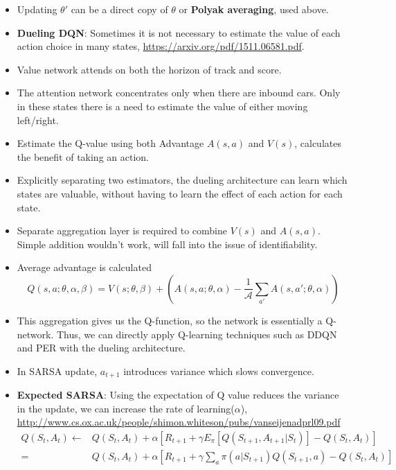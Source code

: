 \documentclass[a4paper]{article}
\begin{document}
\begin{itemize}
    \item Updating $\theta'$ can be a direct copy of $\theta$ or \textbf{Polyak averaging}, used above.
    \item \textbf{Dueling DQN}: Sometimes it is not necessary to estimate the value of each action choice in many states, \url{https://arxiv.org/pdf/1511.06581.pdf}.
    \item Value network attends on both the horizon of track and score.
    \item The attention network concentrates only when there are inbound cars. Only in these states there is a need to estimate the value of either moving left/right.
    \item Estimate the Q-value using both Advantage $A(s,a)$ and $V(s)$, calculates the benefit of taking an action.
    \item Explicitly separating two estimators, the dueling architecture can learn which states are valuable, without having to learn the effect of each action for each state.
    \item Separate aggregation layer is required to combine $V(s)$ and $A(s,a)$. Simple addition wouldn't work, will fall into the issue of identifiability.
    \item Average advantage is calculated
    \begin{equation*}
        Q(s,a;\theta,\alpha,\beta)=V(s;\theta,\beta)+(A(s,a;\theta,\alpha)-\frac{1}{\mathcal{A}}\sum_{a'}A(s,a';\theta,\alpha))
    \end{equation*}
    \item This aggregation gives us the Q-function, so the network is essentially a Q-network. Thus, we can directly apply Q-learning techniques such as DDQN and PER with the dueling architecture.
    \item In SARSA update, $a_{t+1}$ introduces variance which slows convergence.
    \item \textbf{Expected SARSA}: Using the expectation of Q value reduces the variance in the update, we can increase the rate of learning($\alpha$), \url{http://www.cs.ox.ac.uk/people/shimon.whiteson/pubs/vanseijenadprl09.pdf}
    \begin{equation*}
        \begin{split}
            Q(S_t,A_t)\gets &Q(S_t,A_t)+\alpha[R_{t+1}+\gamma E_\pi[Q(S_{t+1},A_{t+1}|S_t)]-Q(S_t,A_t)]\\
            =&Q(S_t,A_t)+\alpha[R_{t+1}+\gamma \sum_a\pi(a|S_{t+1})Q(S_{t+1},a)-Q(S_t,A_t)]
        \end{split}

\end{equation*}
\end{itemize}
\end{document}
